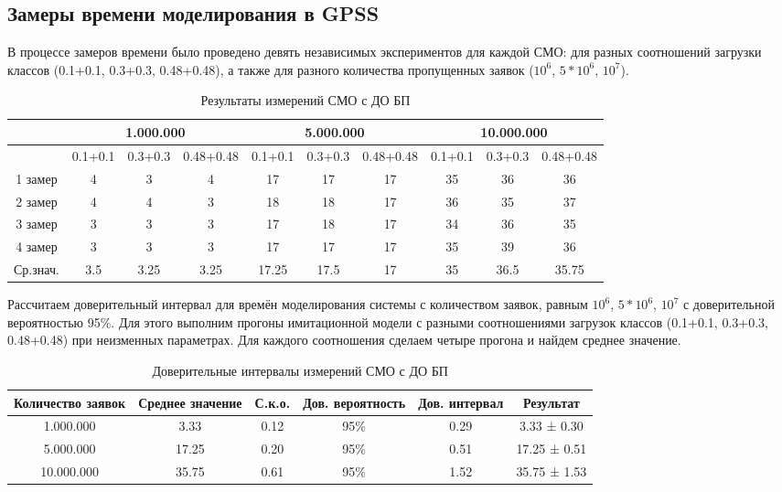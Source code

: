 \documentclass[a4paper,14pt]{report} %
\begin{document}
\subsection{Замеры времени моделирования в GPSS}
В процессе замеров времени было проведено девять независимых экспериментов для каждой СМО: для разных соотношений загрузки классов (0.1+0.1, 0.3+0.3, 0.48+0.48), а также для разного количества пропущенных заявок ($10^6$, $5*10^6$, $10^7$).

\begin{table}[h!]
\caption{Результаты измерений СМО с ДО БП}
\begin{tabular}{|c|c|c|c|c|c|c|c|c|c|}
\hline
 & \multicolumn{3}{|c|}{1.000.000} & \multicolumn{3}{|c|}{5.000.000} & \multicolumn{3}{|c|}{10.000.000} \\
\hline
 & 0.1+0.1 & 0.3+0.3 & 0.48+0.48 & 0.1+0.1 & 0.3+0.3 & 0.48+0.48 & 0.1+0.1 & 0.3+0.3 & 0.48+0.48 \\
\hline
1 замер & 4 & 3 & 4 & 17 & 17 & 17 & 35 & 36 & 36  \\
\hline
2 замер & 4 & 4 & 3 & 18 & 18 & 17 & 36 & 35 & 37 \\
\hline
3 замер & 3 & 3 & 3 & 17 & 18 & 17 & 34 & 36 & 35 \\
\hline
4 замер & 3 & 3 & 3 & 17 & 17 & 17 & 35 & 39 & 36 \\
\hline
Ср.знач. & 3.5 & 3.25 & 3.25 & 17.25 & 17.5 & 17 & 35 & 36.5 & 35.75 \\
\hline
\end{tabular}
\end{table} 

Рассчитаем доверительный интервал для времён моделирования системы с количеством заявок, равным $10^6$, $5*10^6$, $10^7$ с доверительной вероятностью 95\%. Для этого выполним прогоны имитационной модели с разными соотношениями загрузок классов (0.1+0.1, 0.3+0.3, 0.48+0.48) при неизменных параметрах. Для каждого соотношения сделаем четыре прогона и найдем среднее значение.

\begin{table}[h!]
\caption{Доверительные интервалы измерений СМО с ДО БП}
\begin{tabular}{|c|c|c|c|c|c|}
\hline
 Количество заявок & Среднее значение & С.к.о. & Дов. вероятность & Дов. интервал & Результат\\
\hline
1.000.000 & 3.33 & 0.12 & 95\% & 0.29 & 3.33 ± 0.30 \\
\hline
5.000.000 & 17.25 & 0.20 & 95\% & 0.51 & 17.25 ± 0.51 \\
\hline
10.000.000 & 35.75 & 0.61 & 95\% &1.52 & 35.75 ± 1.53 \\
\hline
\end{tabular}
\end{table} 
\end{document}
